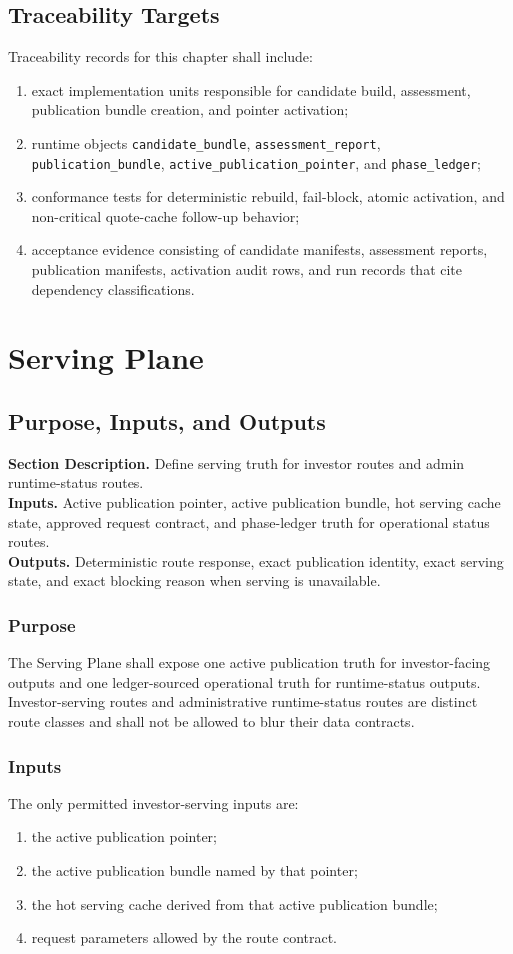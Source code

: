 \documentclass[11pt]{report}
\newcommand{\meta}[3]{\textbf{Section Description.} #1\\
\textbf{Inputs.} #2\\
\textbf{Outputs.} #3\par}
\begin{document}
\section{Traceability Targets}
Traceability records for this chapter shall include:
\begin{enumerate}[leftmargin=1.2cm]
    \item exact implementation units responsible for candidate build, assessment, publication bundle creation, and pointer activation;
    \item runtime objects \texttt{candidate\_bundle}, \texttt{assessment\_report}, \texttt{publication\_bundle}, \texttt{active\_publication\_pointer}, and \texttt{phase\_ledger};
    \item conformance tests for deterministic rebuild, fail-block, atomic activation, and non-critical quote-cache follow-up behavior;
    \item acceptance evidence consisting of candidate manifests, assessment reports, publication manifests, activation audit rows, and run records that cite dependency classifications.
\end{enumerate}

\chapter{Serving Plane}
\section{Purpose, Inputs, and Outputs}
\meta{Define serving truth for investor routes and admin runtime-status routes.}{Active publication pointer, active publication bundle, hot serving cache state, approved request contract, and phase-ledger truth for operational status routes.}{Deterministic route response, exact publication identity, exact serving state, and exact blocking reason when serving is unavailable.}

\subsection{Purpose}
The Serving Plane shall expose one active publication truth for investor-facing outputs and one ledger-sourced operational truth for runtime-status outputs. Investor-serving routes and administrative runtime-status routes are distinct route classes and shall not be allowed to blur their data contracts.

\subsection{Inputs}
The only permitted investor-serving inputs are:
\begin{enumerate}[leftmargin=1.2cm]
    \item the active publication pointer;
    \item the active publication bundle named by that pointer;
    \item the hot serving cache derived from that active publication bundle;
    \item request parameters allowed by the route contract.
\end{enumerate}
\end{document}
